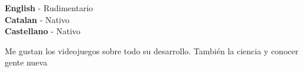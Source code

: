 \documentclass[9pt]{developercv} %
\begin{document}
\begin{minipage}[t]{0.3\textwidth}
	\vspace{-\baselineskip} %

	
	\textbf{English} - Rudimentario\\
	\textbf{Catalan} - Nativo\\
	\textbf{Castellano} - Nativo
\end{minipage}
\hfill
\begin{minipage}[t]{0.3\textwidth}
	\vspace{-\baselineskip} %
	
	
   Me gustan los videojuegos sobre todo su desarrollo. También la ciencia y conocer gente nueva
	
\end{minipage}
\hfill

\end{document}
